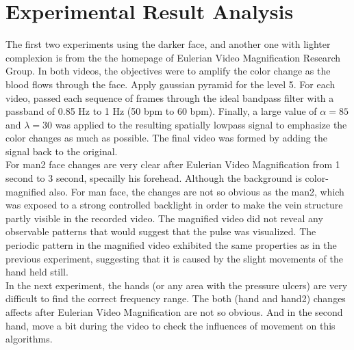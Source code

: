 \section{Experimental Result Analysis}
The first two experiments using the darker face, and another one with lighter complexion is from the the homepage of Eulerian Video Magnification Research Group. In both videos, the objectives were to amplify
the color change as the blood flows through the face. Apply gaussian pyramid for the level 5. For each video, passed each sequence of frames through the ideal bandpass filter with a passband of 0.85 Hz to 1 Hz (50 bpm to 60 bpm). Finally, a large value of $\alpha = 85$ and $\lambda =30$ was
applied to the resulting spatially lowpass signal to emphasize the color changes as much as possible. The final video was formed by adding the signal back to the original.\\

For man2 face changes are very clear after Eulerian Video Magnification from 1 second to 3 second, specailly his forehead. Although the background is color-magnified also. For man face, the changes are not so obvious as the man2,  which was exposed to a strong controlled backlight in order to make the vein structure partly visible in the recorded video. The magnified video did not reveal any observable patterns that would suggest that the pulse was visualized. The periodic pattern in the magnified video exhibited the same properties as in the previous experiment, suggesting that it is caused by the slight movements of the hand held still.\\

In the next experiment, the hands (or any area with the pressure ulcers) are very difficult to find the correct frequency range. The both (hand and hand2) changes affects after Eulerian Video Magnification are not so obvious. And in the second hand, move a bit during the video to check the influences of movement on this algorithms.\\

